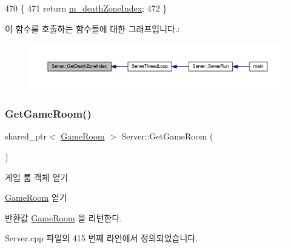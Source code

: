 \begin{DoxyCode}
470 \{
471     \textcolor{keywordflow}{return} \hyperlink{class_server_a279c9f26f808acc351f9167ece2d39fb}{m\_deathZoneIndex};
472 \}
\end{DoxyCode}
이 함수를 호출하는 함수들에 대한 그래프입니다.\+:\nopagebreak
\begin{figure}[H]
\begin{center}
\leavevmode
\includegraphics[width=350pt]{class_server_a636f3c3d5fe8406197f9ea30409fb725_icgraph}
\end{center}
\end{figure}
\mbox{\label{class_server_ab5d6fa91446df16909dfbea64abddf76}} 
\subsubsection{\texorpdfstring{Get\+Game\+Room()}{GetGameRoom()}}
{\footnotesize\ttfamily shared\+\_\+ptr$<$ \hyperlink{class_game_room}{Game\+Room} $>$ Server\+::\+Get\+Game\+Room (\begin{DoxyParamCaption}{ }\end{DoxyParamCaption})}



게임 룸 객체 얻기 

\hyperlink{class_game_room}{Game\+Room} 얻기

\begin{DoxyReturn}{반환값}
\hyperlink{class_game_room}{Game\+Room} 을 리턴한다. 
\end{DoxyReturn}


Server.\+cpp 파일의 415 번째 라인에서 정의되었습니다.



